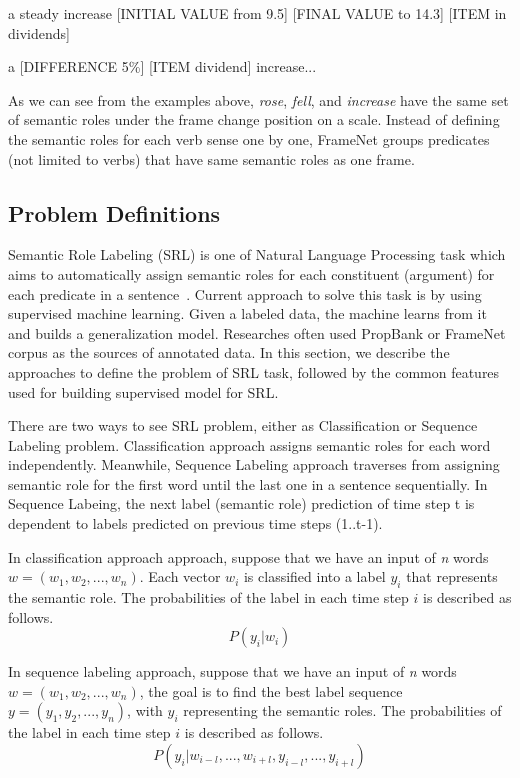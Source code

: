 a steady increase [INITIAL VALUE from 9.5] [FINAL VALUE to 14.3] [ITEM in dividends]

a [DIFFERENCE 5\%] [ITEM dividend] increase... 

As we can see from the examples above, \textit{rose}, \textit{fell}, and \textit{increase} have the same set of semantic roles under the frame change position on a scale. Instead of defining the semantic roles for each verb sense one by one, FrameNet groups predicates (not limited to verbs) that have same semantic roles as one frame.

\subsection{Problem Definitions}
Semantic Role Labeling (SRL) is one of Natural Language Processing task which aims to automatically assign semantic roles for each constituent (argument) for each predicate in a sentence~\citep{jurafsky2000speech}. Current approach to solve this task is by using supervised machine learning. Given a labeled data, the machine learns from it and builds a generalization model. Researches often used PropBank or FrameNet corpus as the sources of annotated data. In this section, we describe the approaches to define the problem of SRL task, followed by the common features used for building supervised model for SRL.

There are two ways to see SRL problem, either as Classification or Sequence Labeling problem. Classification approach assigns semantic roles for each word independently. Meanwhile, Sequence Labeling approach traverses from assigning semantic role for the first word until the last one in a sentence sequentially. In Sequence Labeing, the next label (semantic role) prediction of time step t is dependent to labels predicted on previous time steps (1..t-1).

In classification approach approach, suppose that we have an input of \textit{n} words $w = (w_{1}, w_{2}, ..., w_{n})$. Each vector $w_{i}$ is classified into a label $y_{i}$ that represents the semantic role. The probabilities of the label in each time step $i$ is described as follows.
\begin{equation}
P(y_{i}|w_{i})
\end{equation}

In sequence labeling approach, suppose that we have an input of \textit{n} words $w = (w_{1}, w_{2}, ..., w_{n})$, the goal is to find the best label sequence $y = (y_{1}, y_{2}, ..., y_{n})$, with $y_{i}$ representing the semantic roles. The probabilities of the label in each time step $i$ is described as follows.
\begin{equation}
P(y_{i}|w_{i-l}, ..., w_{i+l},y_{i-l}, ..., y_{i+l})
\end{equation}

